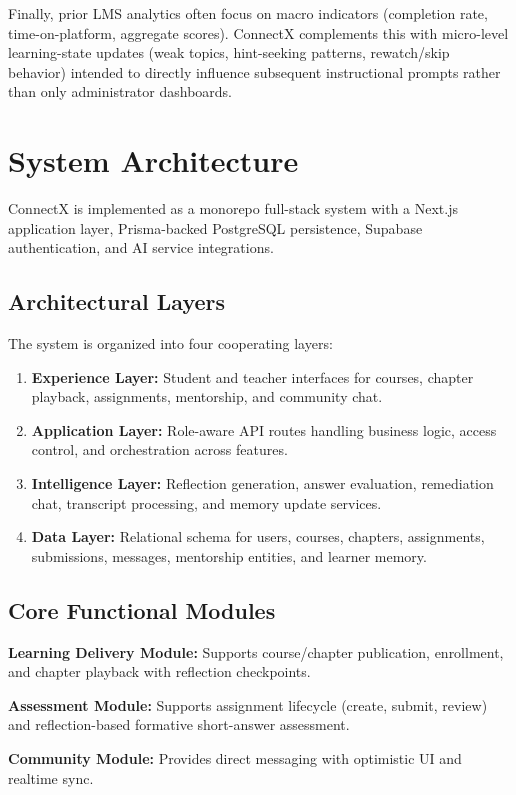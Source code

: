 \documentclass[conference]{IEEEtran}
\begin{document}
Finally, prior LMS analytics often focus on macro indicators (completion rate, time-on-platform, aggregate scores). ConnectX complements this with micro-level learning-state updates (weak topics, hint-seeking patterns, rewatch/skip behavior) intended to directly influence subsequent instructional prompts rather than only administrator dashboards.

\section{System Architecture}
ConnectX is implemented as a monorepo full-stack system with a Next.js application layer, Prisma-backed PostgreSQL persistence, Supabase authentication, and AI service integrations.

\subsection{Architectural Layers}
The system is organized into four cooperating layers:
\begin{enumerate}
\item \textbf{Experience Layer:} Student and teacher interfaces for courses, chapter playback, assignments, mentorship, and community chat.
\item \textbf{Application Layer:} Role-aware API routes handling business logic, access control, and orchestration across features.
\item \textbf{Intelligence Layer:} Reflection generation, answer evaluation, remediation chat, transcript processing, and memory update services.
\item \textbf{Data Layer:} Relational schema for users, courses, chapters, assignments, submissions, messages, mentorship entities, and learner memory.
\end{enumerate}

\subsection{Core Functional Modules}
\textbf{Learning Delivery Module:} Supports course/chapter publication, enrollment, and chapter playback with reflection checkpoints.

\textbf{Assessment Module:} Supports assignment lifecycle (create, submit, review) and reflection-based formative short-answer assessment.

\textbf{Community Module:} Provides direct messaging with optimistic UI and realtime sync.
\end{document}

